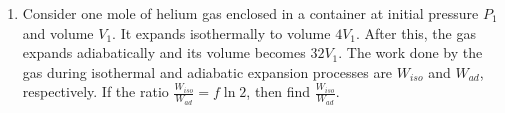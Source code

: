  \begin{enumerate}
\item Consider one mole of helium gas enclosed in a container at initial pressure \(P_1\) and volume \(V_1\). It expands isothermally to volume \(4V_1\). After this, the gas expands adiabatically and its volume becomes \(32V_1\). The work done by the gas during isothermal and adiabatic expansion processes are \(W_{iso}\) and \(W_{ad}\), respectively. If the ratio \(\frac{W_{iso}}{W_{ad}}=f\ln2\), then find \(\frac{W_{iso}}{W_{ad}}\).
\end{enumerate}

\begin{center}
\end{center}